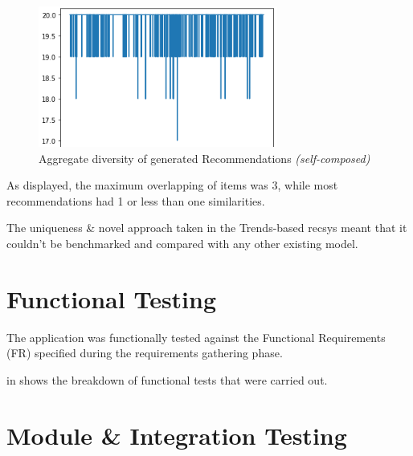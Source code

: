\begin{figure}[h!]
\centering
\includegraphics[width=0.7\textwidth]{images/Testing/trait/aggregate diversity.png}
\caption{Aggregate diversity of generated Recommendations \textit{(self-composed)}}
\label{fig:aggregate-diversity-traits}
\end{figure}

\noindent As displayed, the maximum overlapping of items was 3, while most recommendations had 1 or less than one similarities.


The uniqueness \& novel approach taken in the Trends-based \gls{recsys} meant that it couldn't be benchmarked and compared with any other existing model.

\section{Functional Testing}
The application was functionally tested against the Functional Requirements (FR) specified during the requirements gathering phase.

\noindent\textit{} in \textbf{} shows the breakdown of functional tests that were carried out.

\section{Module \& Integration Testing}




